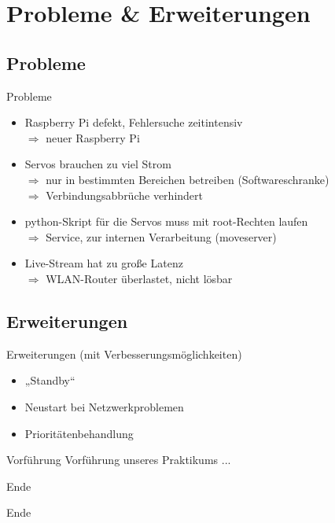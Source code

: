 \documentclass{beamer}
\begin{document}
\section{Probleme \& Erweiterungen}%
\subsection{Probleme}
\begin{frame}{Probleme}
\begin{itemize}
	\item<1-> Raspberry Pi defekt, Fehlersuche zeitintensiv\\
		$\Rightarrow$ neuer Raspberry Pi
	\item<2-> Servos brauchen zu viel Strom\\
		$\Rightarrow$ nur in bestimmten Bereichen betreiben (Softwareschranke)\\
		$\Rightarrow$ Verbindungsabbrüche verhindert
	\item<3-> python-Skript für die Servos muss mit root-Rechten laufen\\
		$\Rightarrow$ Service, zur internen Verarbeitung (moveserver)
	\item<4-> Live-Stream hat zu große Latenz\\
		$\Rightarrow$ WLAN-Router überlastet, nicht lösbar
\end{itemize}
\end{frame}


\subsection{Erweiterungen}
\begin{frame}{Erweiterungen (mit Verbesserungsmöglichkeiten)}
\begin{itemize}
	\item<1-> „Standby“
	\item<2-> Neustart bei Netzwerkproblemen
	\item<3-> Prioritätenbehandlung
\end{itemize}
\end{frame}


\begin{frame}{Vorführung}
	Vorführung unseres Praktikums ...
\end{frame}	

\begin{frame}{Ende}
	\begin{center}\huge Ende\end{center}
\end{frame}
\end{document}
